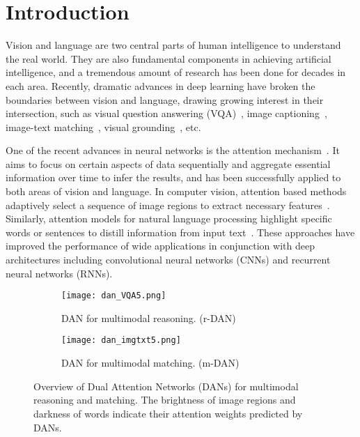 \documentclass[10pt,twocolumn,letterpaper]{article}
\begin{document}
\section{Introduction}
Vision and language are two central parts of human intelligence to understand the real world.
They are also fundamental components in achieving artificial intelligence, and a tremendous amount of research has been done for decades in each area.
Recently, dramatic advances in deep learning have broken the boundaries between vision and language, drawing growing interest in their intersection, such as visual question answering (VQA)~\cite{antol2015vqa,zhou2015simple,noh2016image,yang2016stacked}, image captioning~\cite{xu2015show,annehendricks2016deep}, image-text matching~\cite{hodosh2013framing,karpathy2014deep,mao2015deep,wang2016learning}, visual grounding~\cite{plummer2015flickr30k,hu2016natural}, etc.

One of the recent advances in neural networks is the attention mechanism~\cite{mnih2014recurrent,bahdanau2015neural,xu2015show}.
It aims to focus on certain aspects of data sequentially and aggregate essential information over time to infer the results, and has been successfully applied to both areas of vision and language.
In computer vision, attention based methods adaptively select a sequence of image regions to extract necessary features~\cite{mnih2014recurrent,gregor2015draw,xu2015show}.
Similarly, attention models for natural language processing highlight specific words or sentences to distill information from input text~\cite{bahdanau2015neural,rush2015neural,kumar2016ask}.
These approaches have improved the performance of wide applications in conjunction with deep architectures including convolutional neural networks (CNNs) and recurrent neural networks (RNNs).

\begin{figure}[t]
\begin{center}
\begin{subfigure}[b]{\linewidth}
\texttt{[image: dan\_VQA5.png]}
\vspace{-5mm}
\caption{DAN for multimodal reasoning. (r-DAN)}
\label{fig:dan_vqa}
\vspace{3mm}
\end{subfigure}
\begin{subfigure}[b]{\linewidth}
\texttt{[image: dan\_imgtxt5.png]}
\vspace{-5mm}
\caption{DAN for multimodal matching. (m-DAN)}
\label{fig:dan_matching}
\end{subfigure}
\caption{
Overview of Dual Attention Networks (DANs) for multimodal reasoning and matching.
The brightness of image regions and darkness of words indicate their attention weights predicted by DANs.
}
\label{fig:dan}
\vspace{-5mm}
\end{center}
\end{figure}
\end{document}
